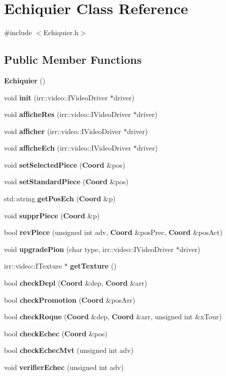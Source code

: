 \section{\-Echiquier \-Class \-Reference}
\label{class_echiquier}


{\ttfamily \#include $<$\-Echiquier.\-h$>$}

\subsection*{\-Public \-Member \-Functions}
\begin{DoxyCompactItemize}
\item 
{\bf \-Echiquier} ()
\item 
void {\bf init} (irr\-::video\-::\-I\-Video\-Driver $\ast$driver)
\item 
void {\bf affiche\-Res} (irr\-::video\-::\-I\-Video\-Driver $\ast$driver)
\item 
void {\bf afficher} (irr\-::video\-::\-I\-Video\-Driver $\ast$driver)
\item 
void {\bf affiche\-Ech} (irr\-::video\-::\-I\-Video\-Driver $\ast$driver)
\item 
void {\bf set\-Selected\-Piece} ({\bf \-Coord} \&pos)
\item 
void {\bf set\-Standard\-Piece} ({\bf \-Coord} \&pos)
\item 
std\-::string {\bf get\-Pos\-Ech} ({\bf \-Coord} \&p)
\item 
void {\bf suppr\-Piece} ({\bf \-Coord} \&p)
\item 
bool {\bf rev\-Piece} (unsigned int adv, {\bf \-Coord} \&pos\-Prec, {\bf \-Coord} \&pos\-Act)
\item 
void {\bf upgrade\-Pion} (char type, irr\-::video\-::\-I\-Video\-Driver $\ast$driver)
\item 
irr\-::video\-::\-I\-Texture $\ast$ {\bf get\-Texture} ()
\item 
bool {\bf check\-Depl} ({\bf \-Coord} \&dep, {\bf \-Coord} \&arr)
\item 
bool {\bf check\-Promotion} ({\bf \-Coord} \&pos\-Arr)
\item 
bool {\bf check\-Roque} ({\bf \-Coord} \&dep, {\bf \-Coord} \&arr, unsigned int \&x\-Tour)
\item 
bool {\bf check\-Echec} ({\bf \-Coord} \&pos)
\item 
bool {\bf check\-Echec\-Mvt} (unsigned int adv)
\item 
void {\bf verifier\-Echec} (unsigned int adv)

\end{DoxyCompactItemize}
